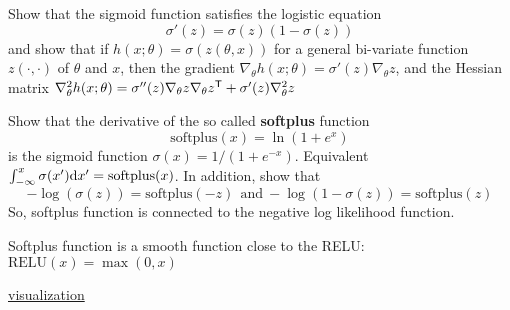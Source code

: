 \documentclass[english,handout]{beamer}
\begin{document}
 
 
 
 \frame
 {
 
 \begin{ex}
Show that the sigmoid function satisfies  the logistic equation
\[
 {\sigma'(z) =\sigma(z)(1-\sigma(z))}
\]
and show that if $h(x;\theta)=\sigma(z(\theta,x))$
for a general bi-variate function $z(\cdot,\cdot)$ of $\theta$ and $x$, then 
the gradient 
$\nabla_\theta h(x;\theta)=\sigma'(z)\nabla_\theta z $,
and the Hessian matrix
$
\nabla^2_\theta h(x;\theta) = \sigma''(z) \nabla_\theta z \nabla_\theta z^{\textsf{T}} 
+\sigma'(z) \nabla^2_\theta z
$ 
\end{ex}


\begin{ex}
Show that the derivative of the so called
{\bf softplus} function 
\[
\mbox{softplus}(x) = \ln (1+e^x) 
\]
is 
the sigmoid function $\sigma(x)=1/(1+e^{-x})$.
Equivalent
$\int_{-\infty}^x \sigma(x')\mathrm{d} x' = \mbox{softplus}(x) $.
In addition, show that 
$$-\log ( \sigma(z)) = \mbox{softplus}(-z)
~~\mbox{and} ~ 
-\log (1- \sigma(z)) = \mbox{softplus}(z)$$
So, softplus function is connected to the 
negative log likelihood function.
\end{ex}
Softplus function is 
a smooth function close to 
the RELU: $\mbox{RELU}(x)= \max(0,x)$

\href{https://www.desmos.com/calculator/4ophg8wvju}
{visualization}
}
\end{document}
